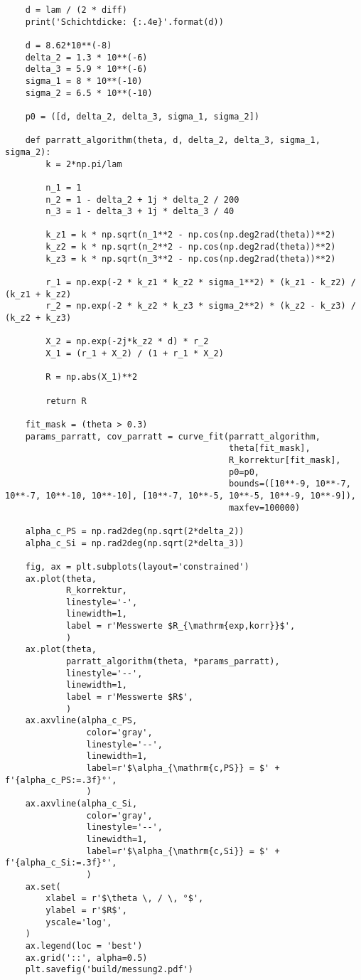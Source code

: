 \begin{lstlisting}
    d = lam / (2 * diff)
    print('Schichtdicke: {:.4e}'.format(d))
    
    d = 8.62*10**(-8)
    delta_2 = 1.3 * 10**(-6)
    delta_3 = 5.9 * 10**(-6)
    sigma_1 = 8 * 10**(-10)
    sigma_2 = 6.5 * 10**(-10)
    
    p0 = ([d, delta_2, delta_3, sigma_1, sigma_2])
    
    def parratt_algorithm(theta, d, delta_2, delta_3, sigma_1, sigma_2):
        k = 2*np.pi/lam
    
        n_1 = 1
        n_2 = 1 - delta_2 + 1j * delta_2 / 200
        n_3 = 1 - delta_3 + 1j * delta_3 / 40
        
        k_z1 = k * np.sqrt(n_1**2 - np.cos(np.deg2rad(theta))**2)
        k_z2 = k * np.sqrt(n_2**2 - np.cos(np.deg2rad(theta))**2)
        k_z3 = k * np.sqrt(n_3**2 - np.cos(np.deg2rad(theta))**2)
    
        r_1 = np.exp(-2 * k_z1 * k_z2 * sigma_1**2) * (k_z1 - k_z2) / (k_z1 + k_z2)
        r_2 = np.exp(-2 * k_z2 * k_z3 * sigma_2**2) * (k_z2 - k_z3) / (k_z2 + k_z3)
    
        X_2 = np.exp(-2j*k_z2 * d) * r_2
        X_1 = (r_1 + X_2) / (1 + r_1 * X_2)
    
        R = np.abs(X_1)**2
    
        return R
    
    fit_mask = (theta > 0.3)
    params_parratt, cov_parratt = curve_fit(parratt_algorithm,
                                            theta[fit_mask],
                                            R_korrektur[fit_mask],
                                            p0=p0,
                                            bounds=([10**-9, 10**-7, 10**-7, 10**-10, 10**-10], [10**-7, 10**-5, 10**-5, 10**-9, 10**-9]),
                                            maxfev=100000)
    
    alpha_c_PS = np.rad2deg(np.sqrt(2*delta_2))
    alpha_c_Si = np.rad2deg(np.sqrt(2*delta_3))
    
    fig, ax = plt.subplots(layout='constrained')
    ax.plot(theta,
            R_korrektur,
            linestyle='-',
            linewidth=1,
            label = r'Messwerte $R_{\mathrm{exp,korr}}$',
            )
    ax.plot(theta,
            parratt_algorithm(theta, *params_parratt),
            linestyle='--',
            linewidth=1,
            label = r'Messwerte $R$',
            )
    ax.axvline(alpha_c_PS,
                color='gray',
                linestyle='--',
                linewidth=1,
                label=r'$\alpha_{\mathrm{c,PS}} = $' + f'{alpha_c_PS:=.3f}°',
                )
    ax.axvline(alpha_c_Si,
                color='gray',
                linestyle='--',
                linewidth=1,
                label=r'$\alpha_{\mathrm{c,Si}} = $' + f'{alpha_c_Si:=.3f}°',
                )
    ax.set(
        xlabel = r'$\theta \, / \, °$',
        ylabel = r'$R$',
        yscale='log',
    )
    ax.legend(loc = 'best')
    ax.grid('::', alpha=0.5)
    plt.savefig('build/messung2.pdf')
\end{lstlisting}